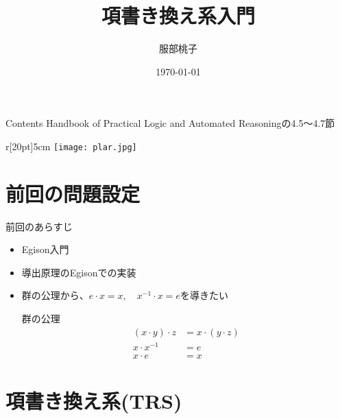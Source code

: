 \documentclass[dvipdfmx,11pt,notheorems]{beamer}
\title[]{項書き換え系入門}%
\author[]{服部桃子}%
\date{\today}%
\theoremstyle{definition}
\begin{document}
\begin{frame}[plain]\frametitle{}
\titlepage %
\end{frame}

\begin{frame}{Contents}
  Handbook of Practical Logic and Automated Reasoningの4.5〜4.7節
  \begin{wrapfigure}{r}[20pt]{5cm}
    \texttt{[image: plar.jpg]}
  \end{wrapfigure}

  \tableofcontents %
\end{frame}

\section{前回の問題設定}
\begin{frame}{前回のあらすじ}
  \begin{itemize}
    \item Egison入門
    \item 導出原理のEgisonでの実装
    \item 群の公理から、$e\cdot x = x,\quad x^{-1} \cdot x = e$を導きたい
    \begin{exampleblock}{群の公理}
      \vspace{-10pt}
      \begin{align*}
        (x \cdot y) \cdot z &= x \cdot (y \cdot z) \\
        x \cdot x^{-1} &= e \\
        x \cdot e &= x
      \end{align*}
    \end{exampleblock}
  \end{itemize}
\end{frame}

\section{項書き換え系(TRS)}
\end{document}
